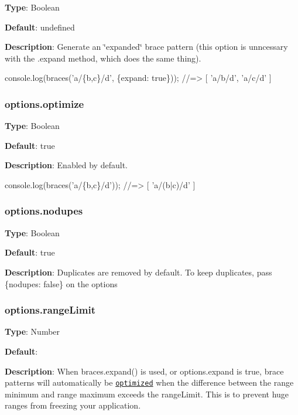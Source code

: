 {\bfseries Type}\+: {\ttfamily Boolean}

{\bfseries Default}\+: {\ttfamily undefined}

{\bfseries Description}\+: Generate an \char`\"{}expanded\char`\"{} brace pattern (this option is unncessary with the {\ttfamily .expand} method, which does the same thing).


\begin{DoxyCode}
console.log(braces('a/\{b,c\}/d', \{expand: true\}));
//=> [ 'a/b/d', 'a/c/d' ]
\end{DoxyCode}


\subsubsection*{options.\+optimize}

{\bfseries Type}\+: {\ttfamily Boolean}

{\bfseries Default}\+: {\ttfamily true}

{\bfseries Description}\+: Enabled by default.


\begin{DoxyCode}
console.log(braces('a/\{b,c\}/d'));
//=> [ 'a/(b|c)/d' ]
\end{DoxyCode}


\subsubsection*{options.\+nodupes}

{\bfseries Type}\+: {\ttfamily Boolean}

{\bfseries Default}\+: {\ttfamily true}

{\bfseries Description}\+: Duplicates are removed by default. To keep duplicates, pass {\ttfamily \{nodupes\+: false\}} on the options

\subsubsection*{options.\+range\+Limit}

{\bfseries Type}\+: {\ttfamily Number}

{\bfseries Default}\+: {}

{\bfseries Description}\+: When {\ttfamily braces.\+expand()} is used, or {\ttfamily options.\+expand} is true, brace patterns will automatically be \href{#optionsoptimize}{\tt optimized} when the difference between the range minimum and range maximum exceeds the {\ttfamily range\+Limit}. This is to prevent huge ranges from freezing your application.

